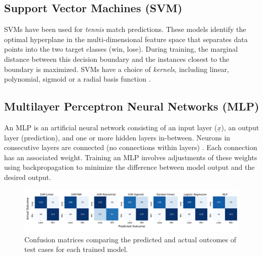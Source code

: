 \subsection{Support Vector Machines (SVM)}
SVMs have been used for  \textit{tennis} match predictions.
These models identify the optimal hyperplane in the multi-dimensional feature space that separates data points into the two target classes (win, lose). During training, the marginal distance between this decision boundary and the instances closest to the boundary is maximized. %
SVMs have a choice of \textit{kernels}, including linear, polynomial, sigmoid or a radial basis function
 \cite{cornman2017machine}.

\subsection{Multilayer Perceptron Neural Networks (MLP)}
An MLP is an artificial neural network consisting of an input layer ($\underline{x}$), an output layer (prediction), and  one or more hidden layers in-between. Neurons in consecutive layers are connected (no connections within layers) \cite{noriega2005multilayer}. Each connection has an associated weight. Training an MLP involves adjustments of these weights using backpropagation to minimize the difference between model output and the desired output.

\begin{figure}[h]
\centering
\includegraphics[width=18cm]{plots/confusionmatrices.pdf}
\vspace{-1em}
\caption{Confusion matrices comparing the predicted and actual outcomes of test cases for each trained model.}

\label{fig:confusionmatrices}
\vspace{-0.2cm}
\centering
\end{figure}